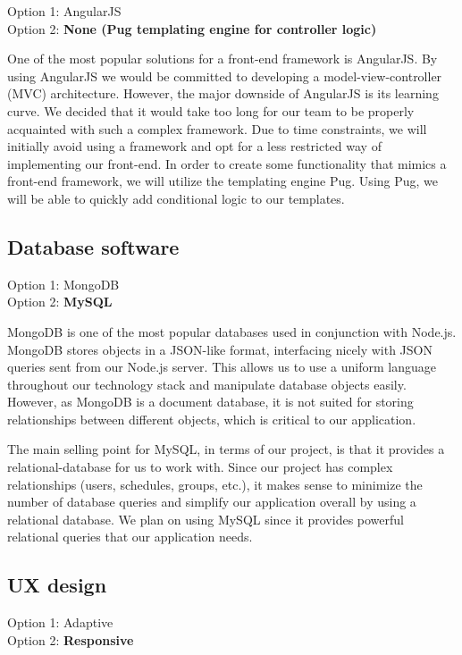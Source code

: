 \documentclass[12pt]{article}
\newcommand{\br}{\vspace{2mm}}
\begin{document}
\noindent
Option 1: AngularJS \\
Option 2: \textbf{None (Pug templating engine for controller logic)}

\br

One of the most popular solutions for a front-end framework is AngularJS. By using AngularJS we would be committed to developing a model-view-controller (MVC) architecture. However, the major downside of AngularJS is its learning curve. We decided that it would take too long for our team to be properly acquainted with such a complex framework. Due to time constraints, we will initially avoid using a framework and opt for a less restricted way of implementing our front-end. In order to create some functionality that mimics a front-end framework, we will utilize the templating engine Pug. Using Pug, we will be able to quickly add conditional logic to our templates.

\subsection*{Database software}

\noindent
Option 1: MongoDB \\
Option 2: \textbf{MySQL}

\br

MongoDB is one of the most popular databases used in conjunction with Node.js. MongoDB stores objects in a JSON-like format, interfacing nicely with JSON queries sent from our Node.js server. This allows us to use a uniform language throughout our technology stack and manipulate database objects easily. However, as MongoDB is a document database, it is not suited for storing relationships between different objects, which is critical to our application.

The main selling point for MySQL, in terms of our project, is that it provides a relational-database for us to work with. Since our project has complex relationships (users, schedules, groups, etc.), it makes sense to minimize the number of database queries and simplify our application overall by using a relational database. We plan on using MySQL since it provides powerful relational queries that our application needs.

\subsection*{UX design}

\noindent
Option 1: Adaptive \\
Option 2: \textbf{Responsive}
\end{document}
